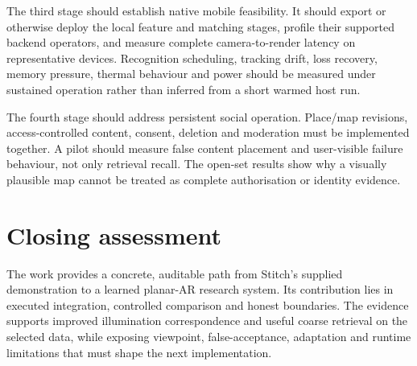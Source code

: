The third stage should establish native mobile feasibility. It should export or otherwise deploy the local feature and matching stages, profile their supported backend operators, and measure complete camera-to-render latency on representative devices. Recognition scheduling, tracking drift, loss recovery, memory pressure, thermal behaviour and power should be measured under sustained operation rather than inferred from a short warmed host run.

The fourth stage should address persistent social operation. Place/map revisions, access-controlled content, consent, deletion and moderation must be implemented together. A pilot should measure false content placement and user-visible failure behaviour, not only retrieval recall. The open-set results show why a visually plausible map cannot be treated as complete authorisation or identity evidence.

\section{Closing assessment}
The work provides a concrete, auditable path from Stitch's supplied demonstration to a learned planar-AR research system. Its contribution lies in executed integration, controlled comparison and honest boundaries. The evidence supports improved illumination correspondence and useful coarse retrieval on the selected data, while exposing viewpoint, false-acceptance, adaptation and runtime limitations that must shape the next implementation.
